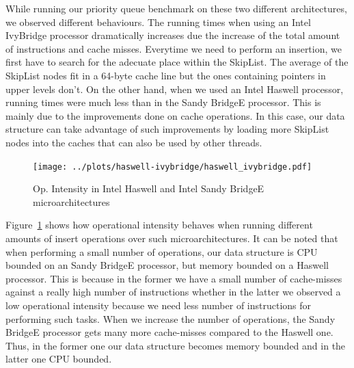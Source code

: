 While running our priority queue benchmark on these two different architectures, we observed different behaviours. The running times when using an Intel IvyBridge processor dramatically increases due the increase of the total amount of instructions and cache misses. Everytime we need to perform an insertion, we first have to search for the adecuate place within the SkipList. The average of the SkipList nodes fit in a 64-byte cache line but the ones containing pointers in upper levels don't. On the other hand, when we used an Intel Haswell processor, running times were much less than in the Sandy BridgeE processor. This is mainly due to the improvements done on cache operations. In this case, our data structure can take advantage of such improvements by loading more SkipList nodes into the caches that can also be used by other threads.

\begin{figure}
	\centering
  	\texttt{[image: ../plots/haswell-ivybridge/haswell\_ivybridge.pdf]}
	\caption{Op. Intensity in Intel Haswell and Intel Sandy BridgeE microarchitectures}
	\label{fig:haswell_ivybridge}
\end{figure}

Figure~\ref{fig:haswell_ivybridge} shows how operational intensity behaves when running different amounts of insert operations over such microarchitectures. It can be noted that when performing a small number of operations, our data structure is CPU bounded on an Sandy BridgeE processor, but memory bounded on a Haswell processor. This is because in the former we have a small number of cache-misses against a really high number of instructions whether in the latter we observed a low operational intensity because we need less number of instructions for performing such tasks. When we increase the number of operations, the Sandy BridgeE processor gets many more cache-misses compared to the Haswell one. Thus, in the former one our data structure becomes memory bounded and in the latter one CPU bounded.

